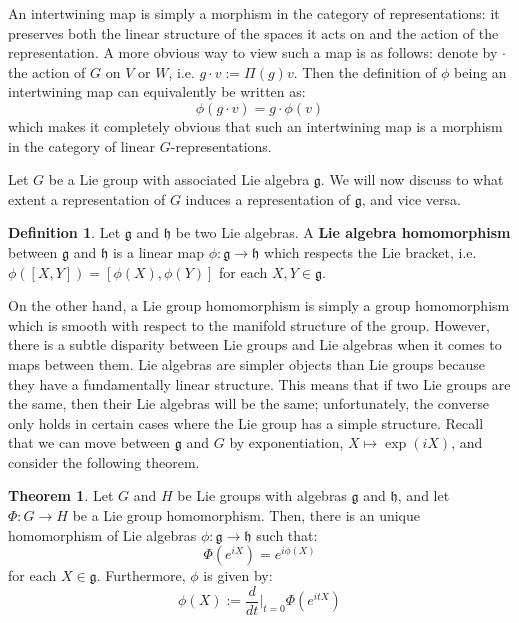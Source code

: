 \documentclass[11pt, oneside]{article}   	%
\theoremstyle{definition}
\newtheorem{definition}{Definition}[section]
\newtheorem{theorem}{Theorem}[section]
\begin{document}
An intertwining map is simply a morphism in the category of representations: it preserves both the linear 
structure of the spaces it acts on and the action of the representation. A more obvious way to view such a map 
is as follows: denote by $\cdot$ the action of $G$ on $V$ or $W$, i.e. $g\cdot v := \Pi(g)v$. Then the definition of 
$\phi$ being an intertwining map can equivalently be written as:
\begin{equation}
	\phi(g\cdot v) = g\cdot \phi(v)
\end{equation}
which makes it completely obvious that such an intertwining map is a morphism in the category of linear 
$G$-representations. 

Let $G$ be a Lie group with associated Lie algebra $\mathfrak g$. We will now discuss to what extent a representation 
of $G$ induces a representation of $\mathfrak g$, and vice versa. 
\begin{definition}
	Let $\mathfrak g$ and $\mathfrak h$ be two Lie algebras. A \textbf{Lie algebra homomorphism} between $\mathfrak g$ 
	and $\mathfrak h$ is a linear map $\phi : \mathfrak g\rightarrow\mathfrak h$ which respects the Lie bracket, i.e. 
	$\phi([X, Y]) = [\phi(X), \phi(Y)]$ for each $X, Y\in\mathfrak g$. 
\end{definition}
On the other hand, a Lie group homomorphism is simply a group homomorphism which is smooth with respect to 
the manifold structure of the group. However, there is a subtle disparity between Lie groups and Lie algebras when 
it comes to maps between them. Lie algebras are simpler objects than Lie groups because they have a fundamentally 
linear structure. This means that if two Lie groups are the same, then their Lie algebras will be the same; unfortunately, 
the converse only holds in certain cases where the Lie group has a simple structure. Recall that we can move between 
$\mathfrak g$ and $G$ by exponentiation, $X\mapsto \exp(iX)$, and consider the following theorem.
\begin{theorem}
	Let $G$ and $H$ be Lie groups with algebras $\mathfrak g$ and $\mathfrak h$, and let $\Phi : G\rightarrow H$ be a 
	Lie group homomorphism. Then, there is an unique homomorphism of Lie algebras $\phi : \mathfrak g\rightarrow\mathfrak 
	h$ such that:
	\begin{equation}
		\Phi(e^{iX}) = e^{i\phi(X)}
	\end{equation}
	for each $X\in\mathfrak g$. Furthermore, $\phi$ is given by:
	\begin{equation}
		\phi(X) := \frac{d}{dt}\bigg|_{t = 0}\Phi(e^{itX})
	\end{equation}
\end{theorem}
\end{document}
